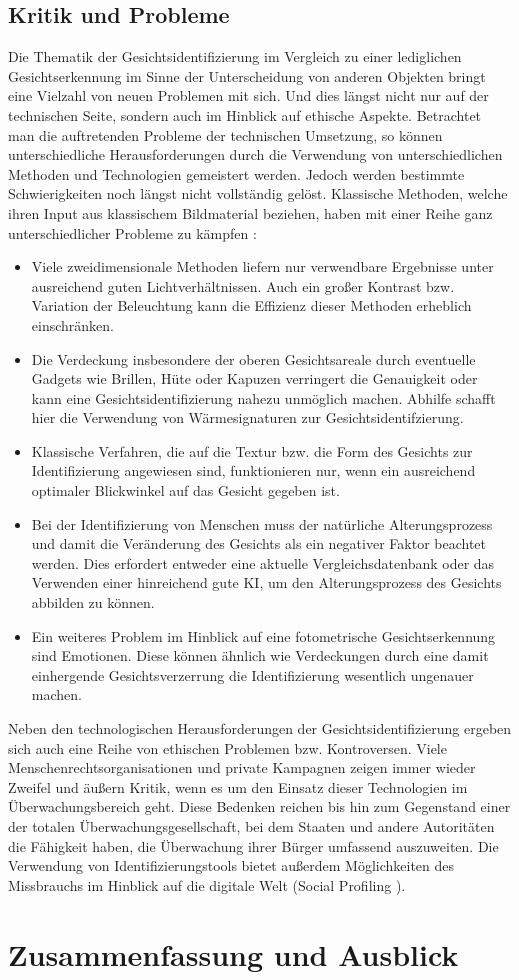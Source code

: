 \documentclass[doktyp=semarbeit, sprache=german]{TUBAFarbeiten}
\begin{document}
\subsection{Kritik und Probleme}
Die Thematik der Gesichtsidentifizierung im Vergleich zu einer lediglichen Gesichtserkennung im Sinne der Unterscheidung von anderen Objekten bringt eine Vielzahl von neuen Problemen mit sich. Und dies längst nicht nur auf der technischen Seite, sondern auch im Hinblick auf ethische Aspekte.
Betrachtet man die auftretenden Probleme der technischen Umsetzung, so können unterschiedliche Herausforderungen durch die Verwendung von unterschiedlichen Methoden und Technologien gemeistert werden. Jedoch werden bestimmte Schwierigkeiten noch längst nicht vollständig gelöst. Klassische Methoden, welche ihren Input aus klassischem Bildmaterial beziehen, haben mit einer Reihe ganz unterschiedlicher Probleme zu kämpfen \cite{MainBook}:
\begin{itemize}
\item Viele zweidimensionale Methoden liefern nur verwendbare Ergebnisse unter ausreichend guten Lichtverhältnissen. Auch ein großer Kontrast bzw. Variation der Beleuchtung kann die Effizienz dieser Methoden erheblich einschränken.
\item Die Verdeckung insbesondere der oberen Gesichtsareale durch eventuelle Gadgets wie Brillen, Hüte oder Kapuzen verringert die Genauigkeit oder kann eine Gesichtsidentifizierung nahezu unmöglich machen. Abhilfe schafft hier die Verwendung von Wärmesignaturen zur Gesichtsidentifzierung.
\item Klassische Verfahren, die auf die Textur bzw. die Form des Gesichts zur Identifizierung angewiesen sind, funktionieren nur, wenn ein ausreichend optimaler Blickwinkel auf das Gesicht gegeben ist.
\item Bei der Identifizierung von Menschen muss der natürliche Alterungsprozess und damit die Veränderung des Gesichts als ein negativer Faktor beachtet werden. Dies erfordert entweder eine aktuelle Vergleichsdatenbank oder das Verwenden einer hinreichend gute KI, um den Alterungsprozess des Gesichts abbilden zu können.
\item Ein weiteres Problem im Hinblick auf eine fotometrische Gesichtserkennung sind Emotionen. Diese können ähnlich wie Verdeckungen durch eine damit einhergende Gesichtsverzerrung die Identifizierung wesentlich ungenauer machen.
\end{itemize}
Neben den technologischen Herausforderungen der Gesichtsidentifizierung ergeben sich auch eine Reihe von ethischen Problemen bzw. Kontroversen. Viele Menschenrechtsorganisationen und private Kampagnen zeigen immer wieder Zweifel und äußern Kritik, wenn es um den Einsatz dieser Technologien im Überwachungsbereich geht. Diese Bedenken reichen bis hin zum Gegenstand einer der \glqq totalen Überwachungsgesellschaft\grqq{}, bei dem Staaten und andere Autoritäten die Fähigkeit haben, die Überwachung ihrer Bürger umfassend auszuweiten. Die Verwendung von Identifizierungstools bietet außerdem Möglichkeiten des Missbrauchs im Hinblick auf die digitale Welt (Social Profiling \cite{SocialProfiling}).

\section{Zusammenfassung und Ausblick}
\newpage
{}
\end{document}
